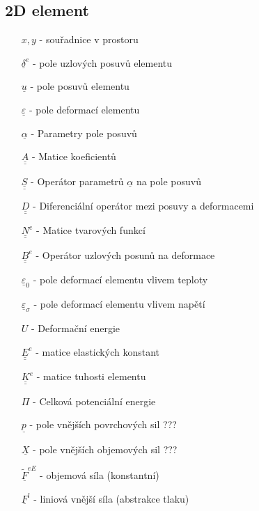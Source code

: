\documentclass[10pt,oneside]{article}
\newcommand{\ul}[1]{\underline{#1}}
\newcommand{\ull}[1]{\underline{\underline{#1}}}
\begin{document}
\newpage
\subsection*{2D element}
\begin{multicols}{2}
\begin{itemize}
	\item [$x,y$] - souřadnice v prostoru
	\item [$\ul{\delta}^e$] - pole uzlových posuvů elementu
	\\[-.5em]
	\item [$\ul{u}$] - pole posuvů elementu
	\item [$\ul{\varepsilon}$] - pole deformací elementu
	\\[-.5em]
	\item [$\ul{\alpha}$] - Parametry pole posuvů
	\item [$\ull{A}$] - Matice koeficientů
	\item [$\ull{S}$] - Operátor parametrů $\ul{\alpha}$ na pole posuvů
	\item [$\ull{D}$] - Diferenciální operátor mezi posuvy a deformacemi
	\\[-.5em]
	\item [$\ull{N}^e$] - Matice tvarových funkcí
	\item [$\ull{B}^e$] - Operátor uzlových posunů na deformace
	\\[-.5em]
	\item [$\ul{\varepsilon}_0$] - pole deformací elementu vlivem teploty
	\item [$\ul{\varepsilon}_\sigma$] - pole deformací elementu vlivem napětí
	\\[-.5em]
	\item [$U$] - Deformační energie
	\item [$\ull{E}^e$] - matice elastických konstant 
	\item [$\ull{K}^e$] - matice tuhosti elementu
	\\[-.5em]
	\item [$\Pi$] - Celková potenciální energie
	\item [$\ul{p}$] - pole vnějších povrchových sil ???
	\item [$\ul{X}$] - pole vnějších objemových sil ???
	\\[-.5em]
	\item [$\ul{\tilde{F}}^{eE}$] - objemová síla (konstantní)
	\item [$\ul{F}^{l}$] - liniová vnější síla (abstrakce tlaku)
\end{itemize}
\end{multicols}
\end{document}
